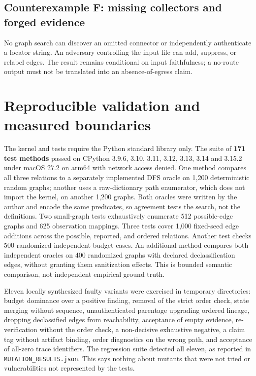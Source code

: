 \documentclass[11pt,letterpaper]{article}
\newcommand{\code}[1]{\texttt{#1}}
\begin{document}
\subsection{Counterexample F: missing collectors and forged evidence}
No graph search can discover an omitted connector or independently authenticate a locator string. An adversary controlling the input file can add, suppress, or relabel edges. The result remains conditional on input faithfulness; a no-route output must not be translated into an absence-of-egress claim.

\section{Reproducible validation and measured boundaries}
The kernel and tests require the Python standard library only. The suite of \textbf{171 test methods} passed on CPython 3.9.6, 3.10, 3.11, 3.12, 3.13, 3.14 and 3.15.2 under macOS 27.2 on arm64 with network access denied. One method compares all three relations to a separately implemented DFS oracle on 1,200 deterministic random graphs; another uses a raw-dictionary path enumerator, which does not import the kernel, on another 1,200 graphs. Both oracles were written by the author and encode the same predicates, so agreement tests the search, not the definitions. Two small-graph tests exhaustively enumerate 512 possible-edge graphs and 625 observation mappings. Three tests cover 1,000 fixed-seed edge additions across the possible, reported, and ordered relations. Another test checks 500 randomized independent-budget cases. An additional method compares both independent oracles on 400 randomized graphs with declared declassification edges, without granting them sanitization effects. This is bounded semantic comparison, not independent empirical ground truth.

Eleven locally synthesized faulty variants were exercised in temporary directories: budget dominance over a positive finding, removal of the strict order check, state merging without sequence, unauthenticated parentage upgrading ordered lineage, dropping declassified edges from reachability, acceptance of empty evidence, re-verification without the order check, a non-decisive exhaustive negative, a claim tag without artifact binding, order diagnostics on the wrong path, and acceptance of all-zero trace identifiers. The regression suite detected all eleven, as reported in \code{MUTATION\_RESULTS.json}. This says nothing about mutants that were not tried or vulnerabilities not represented by the tests.
\end{document}
